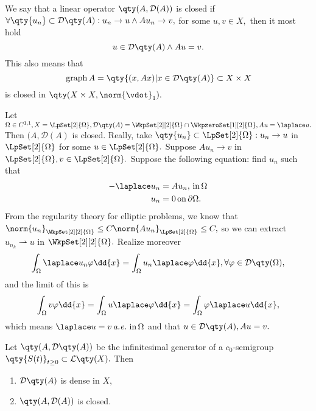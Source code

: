 \begin{definition}
	We say that a linear operator $\qty(A, \mathcal{D}(A))$ is closed if $\forall \qty{u_n} \subset \mathcal{D}\qty(A): u_n \to u \wedge A u_n \to v,$ for some $u,v \in X,$ then it most hold
	\[
		u \in \mathcal{D}\qty(A) \wedge Au = v.
	\]
	This also means that
	\[
		\, \text{graph} \, A = \qty{(x,Ax) | x \in \mathcal{D}\qty(A)} \subset X \times X
	\]
	is closed in $\qty(X \times X,\norm{\vdot}_1).$
\end{definition}

\begin{example}
	Let $ \Omega \in C^{1,1}, X = \LpSet[2]{\Omega}, \mathcal{D}\qty(A) = \WkpSet[2][2]{\Omega} \cap \WkpzeroSet[1][2]{\Omega}, Au = \laplace u.$ Then $(A, \mathcal{D}(A)$ is closed. Really, take $\qty{u_n} \subset \LpSet[2]{\Omega}: u_n \to u$ in $\LpSet[2]{\Omega}$ for some $u \in \LpSet[2]{\Omega}.$ Suppose $Au_n \to v$ in $\LpSet[2]{\Omega}, v \in \LpSet[2]{\Omega}.$ 
	Suppose the following equation: find $u_n$ such that
	\begin{align*}
		-\laplace u_n &= Au_n, \, \text{in} \,\Omega \\
		u_n &= 0 \, \text{on} \, \partial \Omega.
	\end{align*}
	From the regularity theory for elliptic problems, we know that $\norm{u_n}_{\WkpSet[2][2]{\Omega}} \leq C \norm{Au_n}_{\LpSet[2]{\Omega}} \leq C,$ so we can extract $u_{n_k} \rightharpoonup u$ in $\WkpSet[2][2]{\Omega}.$ Realize moreover
	\[
		\int_{\Omega}\laplace u_n \varphi \dd{x} = \int_{\Omega}u_n \laplace \varphi\dd{x}, \forall \varphi \in \mathcal{D}\qty(\Omega),
	\]
	and the limit of this is
	\[
		\int_{\Omega}v \varphi\dd{x} = \int_{\Omega}u \laplace \varphi\dd{x} = \int_{\Omega} \varphi \laplace u \dd{x},
	\]
	which means $\laplace u = v \, \text{\textit{a.e.}} \, \, \text{in} \, \Omega$ and that $u \in \mathcal{D}\qty(A), Au = v.$
\end{example}

\begin{theorem}
	Let $\qty(A, \mathcal{D}\qty(A))$ be the infinitesimal generator of a $c_0$-semigroup $\qty{S(t)}_{t\geq 0} \subset \mathcal{L}\qty(X).$ Then

	\begin{enumerate}
		\item $\mathcal{D}\qty(A)$ is dense in $X$,
		\item $\qty(A, \mathcal{D}(A))$ is closed.
	\end{enumerate}
\end{theorem}

